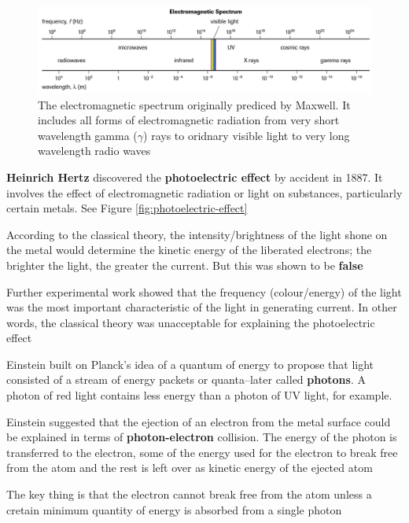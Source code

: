 \begin{figure}[ht!]
    \centering
    \includegraphics[width=\textwidth]{../figures/maxwell-electromagnetic-spectrum.png}
    \caption{The electromagnetic spectrum originally prediced by Maxwell. It includes all forms
        of electromagnetic radiation from very short wavelength gamma ($\gamma$) rays to oridnary
        visible light to very long wavelength radio waves}
    \label{fig:maxwell-electronagmetic-spectrum}
\end{figure}

\begin{bulleted-list}
    \item \textbf{Heinrich Hertz} discovered the \textbf{photoelectric effect} by accident in 1887. It
        involves the effect of electromagnetic radiation or light on substances, particularly 
        certain metals. See Figure \ref{fig:photoelectric-effect}
    \item According to the classical theory, the intensity/brightness of the light shone on
        the metal would determine the kinetic energy of the liberated electrons; the brighter
        the light, the greater the current. But this was shown to be \textbf{false}
    \item Further experimental work showed that the frequency (colour/energy) of the light was
        the most important characteristic of the light in generating current. In other words,
        the classical theory was unacceptable for explaining the photoelectric effect
    \item Einstein built on Planck's idea of a quantum of energy to propose that light consisted
        of a stream of energy packets or quanta--later called \textbf{photons}. A photon of red 
        light contains less energy than a photon of UV light, for example.
    \item Einstein suggested that the ejection of an electron from the metal surface could be 
        explained in terms of \textbf{photon-electron} collision. The energy of the photon
        is transferred to the electron, some of the energy used for the electron to break free
        from the atom and the rest is left over as kinetic energy of the ejected atom
    \item The key thing is that the electron cannot break free from the atom unless a cretain
        minimum quantity of energy is absorbed from a single photon
\end{bulleted-list}

